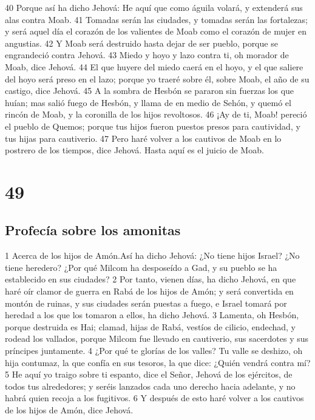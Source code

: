40 Porque así ha dicho Jehová: He aquí que como águila volará, y extenderá sus alas contra Moab.
41 Tomadas serán las ciudades, y tomadas serán las fortalezas; y será aquel día el corazón de los valientes de Moab como el corazón de mujer en angustias.
42 Y Moab será destruido hasta dejar de ser pueblo, porque se engrandeció contra Jehová.
43 Miedo y hoyo y lazo contra ti, oh morador de Moab, dice Jehová.
44 El que huyere del miedo caerá en el hoyo, y el que saliere del hoyo será preso en el lazo; porque yo traeré sobre él, sobre Moab, el año de su castigo, dice Jehová.
45 A la sombra de Hesbón se pararon sin fuerzas los que huían; mas salió fuego de Hesbón, y llama de en medio de Sehón, y quemó el rincón de Moab, y la coronilla de los hijos revoltosos.
46 ¡Ay de ti, Moab! pereció el pueblo de Quemos; porque tus hijos fueron puestos presos para cautividad, y tus hijas para cautiverio.
47 Pero haré volver a los cautivos de Moab en lo postrero de los tiempos, dice Jehová. Hasta aquí es el juicio de Moab.

\chapter{49}

\section*{Profecía sobre los amonitas}

1 Acerca de los hijos de Amón.Así ha dicho Jehová: ¿No tiene hijos Israel? ¿No tiene heredero? ¿Por qué Milcom ha desposeído a Gad, y su pueblo se ha establecido en sus ciudades?
2 Por tanto, vienen días, ha dicho Jehová, en que haré oír clamor de guerra en Rabá de los hijos de Amón; y será convertida en montón de ruinas, y sus ciudades serán puestas a fuego, e Israel tomará por heredad a los que los tomaron a ellos, ha dicho Jehová.
3 Lamenta, oh Hesbón, porque destruida es Hai; clamad, hijas de Rabá, vestíos de cilicio, endechad, y rodead los vallados, porque Milcom fue llevado en cautiverio, sus sacerdotes y sus príncipes juntamente.
4 ¿Por qué te glorías de los valles? Tu valle se deshizo, oh hija contumaz, la que confía en sus tesoros, la que dice: ¿Quién vendrá contra mí?
5 He aquí yo traigo sobre ti espanto, dice el Señor, Jehová de los ejércitos, de todos tus alrededores; y seréis lanzados cada uno derecho hacia adelante, y no habrá quien recoja a los fugitivos.
6 Y después de esto haré volver a los cautivos de los hijos de Amón, dice Jehová.

